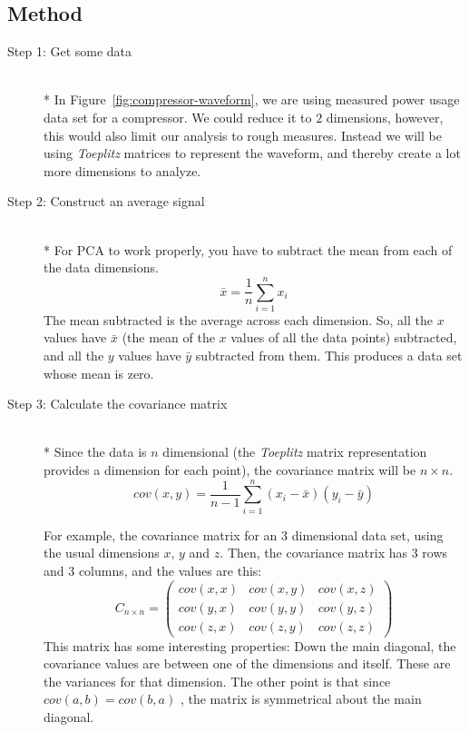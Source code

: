 \documentclass[paper=letter, fontsize=11pt, onecolunm, twoside]{scrartcl}
\begin{document}
\subsection{Method}
\begin{description}%
\item[Step 1: Get some data] ~\\*
In Figure~\ref{fig:compressor-waveform}, we are  using measured power
usage data set for a compressor. We could reduce it to $2$ dimensions,
however, this would also limit our analysis to rough measures. Instead
we will be using \emph{Toeplitz} matrices to represent the waveform,
and thereby create a lot more dimensions to analyze. 

\item[Step 2: Construct an average signal] ~\\*
For \ac{PCA} to work properly, you have to subtract the mean from each
of the data dimensions.
\begin{equation}
\bar{x} = \frac{1}{n} \sum\limits_{i=1}^{n}x_i
\end{equation}
The mean subtracted is the average across each dimension. So, all the
\(x\) values have \(\bar{x}\) (the mean of the \(x\) values of all the
data points) subtracted, and all the \(y\) values have \(\bar{y}\)
subtracted from them. This produces a data set whose mean is zero.

\item[Step 3: Calculate the covariance matrix] ~\\*
Since the data is $n$ dimensional (the \emph{Toeplitz} matrix
representation provides a dimension for each point), the covariance
matrix will be \(n \times n\).
\begin{equation}
cov(x,y) = \frac{1}{n-1}\sum\limits_{i=1}^{n}(x_i-\bar{x})(y_i-\bar{y})
\end{equation} 

For example, the covariance matrix for an 3 dimensional data set,
using the usual dimensions \(x\), \(y\) and \(z\). Then, the
covariance matrix has 3 rows and 3 columns, and the values are this:
\begin{equation}
C_{n \times n} = 
  \begin{pmatrix}
  cov(x,x) & cov(x,y) & cov(x,z) \\
  cov(y,x) & cov(y,y) & cov(y,z) \\
  cov(z,x) & cov(z,y) & cov(z,z)
  \end{pmatrix}
\end{equation}
This matrix has some interesting properties: Down the main diagonal,
the covariance values are between one of the dimensions and itself.
These are the variances for that dimension.  The other point is that
since \(cov(a,b) = cov(b, a)\) , the matrix is symmetrical about the
main diagonal.


\end{description}
\end{document}
